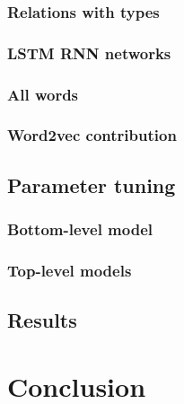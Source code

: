 \documentclass[
  digital, %
  table,   %
  lof,     %
  lot,     %
]{fithesis3}
\begin{document}
\subsection{Relations with types}

\subsection{LSTM RNN networks}

\subsection{All words}

\subsection{Word2vec contribution}


\section{Parameter tuning}

\subsection{Bottom-level model}
\label{eval:bottom-model-tuning}

\subsection{Top-level models}

\section{Results}

\chapter{Conclusion}

\end{document}
